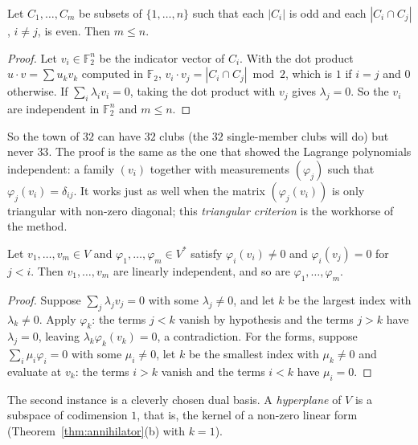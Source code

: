 \begin{theorem}\label{thm:oddtown}
Let $C_1,\dots,C_m$ be subsets of $\{1,\dots,n\}$ such that each $|C_i|$ is odd and each $|C_i\cap C_j|$, $i\ne j$, is
even. Then $m\le n$.
\end{theorem}
\begin{proof}
Let $v_i\in\mathbb F_2^n$ be the indicator vector of $C_i$. With the dot product $u\cdot v=\sum u_kv_k$ computed in
$\mathbb F_2$, $v_i\cdot v_j=|C_i\cap C_j|\bmod2$, which is $1$ if $i=j$ and $0$ otherwise. If $\sum_i\lambda_iv_i=0$,
taking the dot product with $v_j$ gives $\lambda_j=0$. So the $v_i$ are independent in $\mathbb F_2^n$ and $m\le n$.
\end{proof}

So the town of $32$ can have $32$ clubs (the $32$ single-member clubs will do) but never $33$. The proof is the same
as the one that showed the Lagrange polynomials independent: a family $(v_i)$ together with measurements $(\varphi_j)$
such that $\varphi_j(v_i)=\delta_{ij}$. It works just as well when the matrix $(\varphi_j(v_i))$ is only triangular with
non-zero diagonal; this \emph{triangular criterion} is the workhorse of the method.

\begin{proposition}\label{prop:triangular}
Let $v_1,\dots,v_m\in V$ and $\varphi_1,\dots,\varphi_m\in V^*$ satisfy $\varphi_i(v_i)\ne0$ and $\varphi_i(v_j)=0$ for $j<i$.
Then $v_1,\dots,v_m$ are linearly independent, and so are $\varphi_1,\dots,\varphi_m$.
\end{proposition}
\begin{proof}
Suppose $\sum_j\lambda_jv_j=0$ with some $\lambda_j\ne0$, and let $k$ be the largest index with $\lambda_k\ne0$. Apply
$\varphi_k$: the terms $j<k$ vanish by hypothesis and the terms $j>k$ have $\lambda_j=0$, leaving
$\lambda_k\varphi_k(v_k)=0$, a contradiction. For the forms, suppose $\sum_i\mu_i\varphi_i=0$ with some $\mu_i\ne0$, let $k$
be the smallest index with $\mu_k\ne0$ and evaluate at $v_k$: the terms $i>k$ vanish and the terms $i<k$ have $\mu_i=0$.
\end{proof}

The second instance is a cleverly chosen dual basis. A \emph{hyperplane} of $V$ is a subspace of codimension $1$, that is,
the kernel of a non-zero linear form (Theorem~\ref{thm:annihilator}(b) with $k=1$).

